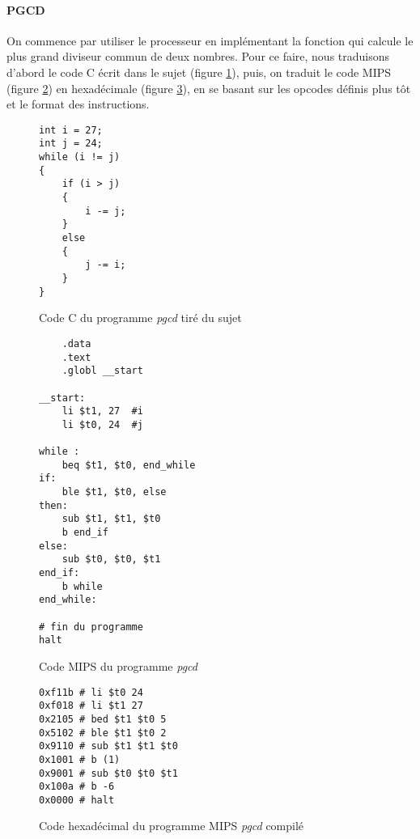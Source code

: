 \paragraph{PGCD}{
	On commence par utiliser le processeur en implémentant la fonction qui
	calcule le plus grand diviseur commun de deux nombres.
	Pour ce faire, nous traduisons d'abord le code C écrit dans le sujet
	(figure \ref{pgcd_c}), puis, on traduit le code MIPS (figure 
	\ref{pgcd_asm}) en hexadécimale (figure \ref{pgcd_hexa}), en se 
	basant sur les opcodes définis plus tôt et le format des instructions.
}

\begin{figure}
	\lstset{
		frame=single,
		numbers=left,
		numbersep=5pt,
		language=C++
	}
	\begin{lstlisting}
int i = 27;
int j = 24;
while (i != j)
{
	if (i > j)
	{
		i -= j;
	}
 	else
 	{
		j -= i;
	}
}
	\end{lstlisting}
	\caption{
		\label{pgcd_c}
		Code C du programme \textit{pgcd} tiré du sujet
	}
\end{figure}

\begin{figure}
	\begin{lstlisting}
	.data
	.text
	.globl __start
	
__start:
	li $t1, 27	#i
	li $t0, 24	#j
	
while :
	beq $t1, $t0, end_while
if:
	ble $t1, $t0, else
then:
	sub $t1, $t1, $t0
	b end_if
else:
	sub $t0, $t0, $t1
end_if:
	b while
end_while:

# fin du programme
halt

	\end{lstlisting}
	\caption{
		\label{pgcd_asm}
		Code MIPS du programme \textit{pgcd}
	}
\end{figure}

\begin{figure}
	\lstset{
		frame=single,
		numbers=left,
		numbersep=5pt,
		language=[mips]Assembler
	}
	\begin{lstlisting}
0xf11b # li $t0 24
0xf018 # li $t1 27
0x2105 # bed $t1 $t0 5
0x5102 # ble $t1 $t0 2
0x9110 # sub $t1 $t1 $t0
0x1001 # b (1)
0x9001 # sub $t0 $t0 $t1
0x100a # b -6
0x0000 # halt
	\end{lstlisting}
	\caption{
		\label{pgcd_hexa}
		Code hexadécimal du programme MIPS \textit{pgcd} compilé
	}
\end{figure}

